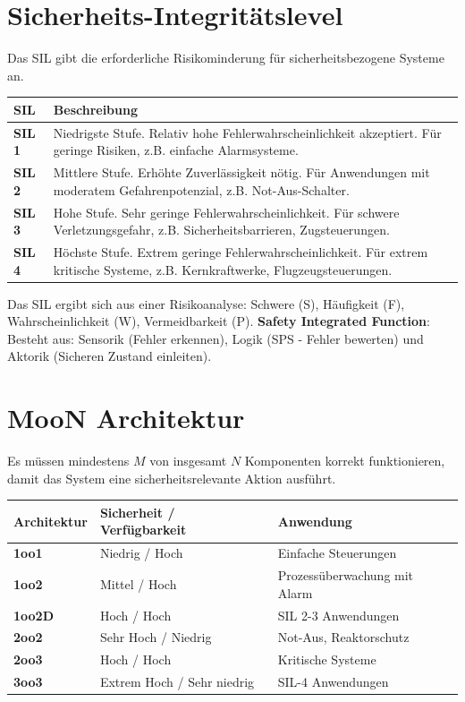 \documentclass[8pt, landscape]{article}
\newcommand{\algo}[1]{\textbf{\textcolor{blue!60!black}{#1}}}
\begin{document}
\begin{multicols*}{4}
\begin{itemize}
\end{itemize}

\section{Sicherheits-Integritätslevel}
Das SIL gibt die erforderliche Risikominderung für sicherheitsbezogene Systeme an.

\noindent
\begin{tabularx}{\linewidth}{l >{\RaggedRight}X}
\toprule
\textbf{SIL} & \textbf{Beschreibung}  \\
\midrule
\textbf{SIL 1} & Niedrigste Stufe. Relativ hohe Fehlerwahrscheinlichkeit akzeptiert. Für geringe Risiken, z.B. einfache Alarmsysteme. \\
\textbf{SIL 2} & Mittlere Stufe. Erhöhte Zuverlässigkeit nötig. Für Anwendungen mit moderatem Gefahrenpotenzial, z.B. Not-Aus-Schalter. \\
\textbf{SIL 3} & Hohe Stufe. Sehr geringe Fehlerwahrscheinlichkeit. Für schwere Verletzungsgefahr, z.B. Sicherheitsbarrieren, Zugsteuerungen. \\
\textbf{SIL 4} & Höchste Stufe. Extrem geringe Fehlerwahrscheinlichkeit. Für extrem kritische Systeme, z.B. Kernkraftwerke, Flugzeugsteuerungen. \\
\bottomrule
\end{tabularx}

Das SIL ergibt sich aus einer Risikoanalyse: Schwere (S), Häufigkeit (F), Wahrscheinlichkeit (W), Vermeidbarkeit (P).
\algo{Safety Integrated Function}: Besteht aus: Sensorik (Fehler erkennen), Logik (SPS - Fehler bewerten) und Aktorik (Sicheren Zustand einleiten).

\section{MooN Architektur}
Es müssen mindestens $M$ von insgesamt $N$ Komponenten korrekt funktionieren, damit das System eine
sicherheitsrelevante Aktion ausführt. 

\noindent
\begingroup
\setlength{\tabcolsep}{4pt}
\renewcommand{\cellalign}{l} %
\begin{tabularx}{\linewidth}{l >{\RaggedRight}X  >{\RaggedRight}X}
\toprule
\textbf{Architektur} &  \textbf{Sicherheit / Verfügbarkeit} & \textbf{Anwendung} \\
\midrule
\textbf{1oo1} &  Niedrig / Hoch & Einfache Steuerungen \\
\textbf{1oo2} & Mittel / Hoch & Prozessüberwachung mit Alarm \\ %
\textbf{1oo2D} & Hoch / Hoch & SIL 2-3 Anwendungen \\
\textbf{2oo2} & Sehr Hoch / Niedrig & Not-Aus, Reaktorschutz \\
\textbf{2oo3} & Hoch / Hoch & Kritische Systeme \\
\textbf{3oo3} & Extrem Hoch / Sehr niedrig & SIL-4 Anwendungen \\


\end{tabularx}
\end{multicols*}
\end{document}
